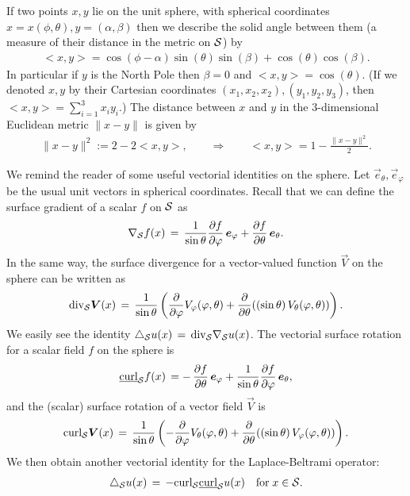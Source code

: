 If two points $x,y$ lie on the unit sphere, with
spherical coordinates $x=x(\phi,\theta), y=(\alpha,\beta)$ then we describe the solid angle between them (a measure of their distance in the metric on $\S$) by
\begin{align*}
  <x,y> =\cos(\phi-\alpha)\sin(\theta)\sin(\beta)+
    \cos(\theta)\cos(\beta).
\end{align*} 
In particular if $y$ is the North Pole then  $\beta=0$ and
$<x,y>=\cos(\theta)$. (If we denoted $x,y$  by their Cartesian
coordinates $(x_1,x_2,x_2),(y_1,y_2,y_3)$, then $<x,y> = \sum_{i=1}^3
x_iy_i$.) The distance between $x$ and $y$ in the 3-dimensional
Euclidean metric $\|x-y\|$ is given by 
\begin{align*}
  \|x-y\|^2 := 2-2<x,y>, \qquad \Rightarrow \qquad 
    <x,y>= 1-\frac{\|x-y\|^2}{2}.
\end{align*}

We remind the reader of some useful vectorial
identities on the sphere. Let $ \vec{e}_\theta,
\vec{e}_{\varphi} $ be the usual unit vectors in spherical coordinates.
Recall that we can define the surface gradient of a scalar $f$ on $\S$
as
\begin{align*}
  \nabla_{\S} f(x) \,  = \, \frac{1}{\sin \theta}
  \frac{\partial f}{\partial \varphi} \,\vec{e}_{\varphi} + 
  \frac{\partial f}{\partial \theta}\, \vec{e}_{\theta}.
\end{align*}
In the same way, the surface divergence for a vector-valued
function $\vec{V}$ on the sphere can be written as
\begin{align*}
  \mbox{div}_{\S} \vec{V}(x) \, = \, 
  \frac{1}{\sin \theta} \left(
  \frac{\partial}{\partial \varphi}
  V_{\varphi}(\varphi,\theta) +
  \frac{\partial}{\partial \theta} ((\sin\theta) \, 
  V_{\theta}(\varphi,\theta) ) \right).
\end{align*}
We easily see the identity $\lap_{\S}u(x) \, = \,
\mbox{div}_{\S}\nabla_{\S} u(x)$.  The vectorial surface rotation for a
scalar field $f$ on the sphere is 
\begin{align*}
  \underline{\mbox{curl}}_{\S} f(x) \, = -\, 
  \frac{\partial f}{\partial \theta} \,\vec{e}_{\varphi} + 
  \frac{1}{\sin\theta}\frac{\partial f}{\partial \varphi}\, 
  \vec{e}_{\theta},
\end{align*}
and the (scalar) surface rotation of a vector field $\vec{V}$ is
\begin{align*}
  \mbox{curl}_{\S} \vec{V}(x) \, = \,
  \frac{1}{\sin \theta} \left(
  - \frac{\partial}{\partial \varphi} V_{\theta}(\varphi,\theta) +
  \frac{\partial}{\partial \theta} ((\sin \theta) \,   
  V_{\varphi}(\varphi,\theta)) \right).
\end{align*}
We then obtain another vectorial identity for the Laplace-Beltrami
operator:
\begin{align*}
  \lap_{\S} u(x) \, = \, - \mbox{curl}_{\S} 
  \underline{\mbox{curl}}_{\S} u(x) \quad \mbox{for} \; x \in {\S}.
\end{align*}


